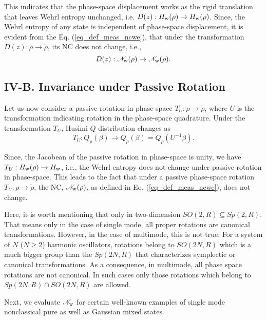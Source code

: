 \documentclass[letter,scriptaddress,twocolumn,prl,showkeys]{revtex4}
\begin{document}
This indicates that the phase-space displacement works as the rigid translation \cite{we_wehrl, we_min_lieb} that leaves Wehrl entropy unchanged, i.e. $D(z): H_{\rm{w}}(\rho)\rightarrow H_{\rm{w}}(\rho)$. 
Since, the Wehrl entropy of any state is independent of phase-space displacement, it is evident from the Eq. (\ref{eq_def_meas_ncwe}), that under the transformation $D(z): \rho\rightarrow\tilde{\rho}$, its NC does not change, i.e.,
\begin{equation}
D(z):\mathscr{N}_{\rm{w}}(\rho)\rightarrow \mathscr{N}_{\rm{w}}(\rho).
\label{eq_ncwe_invar_displace}
\end{equation}

\subsection*{IV-B. Invariance under Passive Rotation}

Let us now consider a passive rotation in phase space $T_{U}:\rho\rightarrow\tilde{\rho}$, where $U$ is the transformation indicating rotation in the phase-space quadrature. 
Under the transformation $T_{U}$, Husimi $Q$ distribution changes as
\begin{equation}
T_{U}:Q_{\rho}(\beta)\rightarrow Q_{\tilde{\rho}}(\beta)=Q_{\rho}(U^{-1}\beta).
\end{equation}

Since, the Jacobean of the passive rotation in phase-space is unity, we have $T_{U}:H_{\rm{w}}(\rho)\rightarrow H_{\rm{w}}$, i.e., the Wehrl entropy does not change under passive rotation in phase-space. 
This leads to the fact that under a passive phase-space rotation $T_{U}:\rho\rightarrow\tilde{\rho}$, the NC, $\mathscr{N}_{\rm{w}}(\rho)$, as defined in Eq. (\ref{eq_def_meas_ncwe}), does not change.

Here, it is worth mentioning that only in two-dimension $SO(2,R)\subseteq Sp(2,R)$.
That means only in the case of single mode, all proper rotations are canonical transformations. 
However, in the case of multimode, this is not true. 
For a system of $N$ ($N\geq 2$) harmonic oscillators, rotations belong to $SO(2N,R)$ which is a much bigger group than the $Sp(2N,R)$ that characterizes symplectic or canonical transformations.
As a consequence, in multimode, all phase space rotations are not canonical.
In such cases only those rotations which belong to $Sp(2N,R)\cap SO(2N,R)$ are allowed.

Next, we evaluate $\mathscr{N}_{\rm{w}}$ for certain well-known examples of single mode nonclassical pure as well as Gaussian mixed states.
\end{document}
